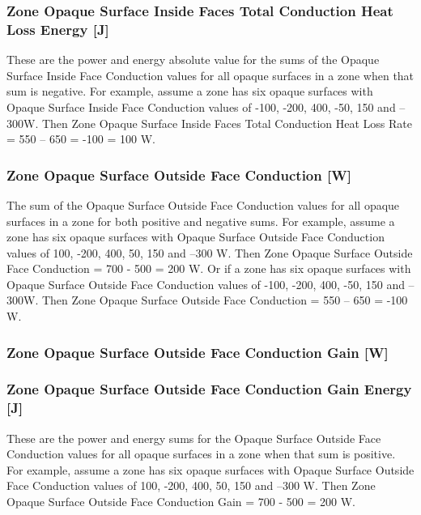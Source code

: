\subsubsection{Zone Opaque Surface Inside Faces Total Conduction Heat Loss Energy {[}J{]}}\label{zone-opaque-surface-inside-faces-total-conduction-heat-loss-energy-j}

These are the power and energy absolute value for the sums of the Opaque Surface Inside Face Conduction values for all opaque surfaces in a zone when that sum is negative. For example, assume a zone has six opaque surfaces with Opaque Surface Inside Face Conduction values of -100, -200, 400, -50, 150 and --300W. Then Zone Opaque Surface Inside Faces Total Conduction Heat Loss Rate = \textbar{}550 -- 650\textbar{} = \textbar{}-100\textbar{} = 100 W.

\subsubsection{Zone Opaque Surface Outside Face Conduction {[}W{]}}\label{zone-opaque-surface-outside-face-conduction-w}

The sum of the Opaque Surface Outside Face Conduction values for all opaque surfaces in a zone for both positive and negative sums. For example, assume a zone has six opaque surfaces with Opaque Surface Outside Face Conduction values of 100, -200, 400, 50, 150 and --300 W. Then Zone Opaque Surface Outside Face Conduction = 700 - 500 = 200 W. Or if a zone has six opaque surfaces with Opaque Surface Outside Face Conduction values of -100, -200, 400, -50, 150 and --300W. Then Zone Opaque Surface Outside Face Conduction = 550 -- 650 = -100 W.

\subsubsection{Zone Opaque Surface Outside Face Conduction Gain {[}W{]}}\label{zone-opaque-surface-outside-face-conduction-gain-w}

\subsubsection{Zone Opaque Surface Outside Face Conduction Gain Energy {[}J{]}}\label{zone-opaque-surface-outside-face-conduction-gain-energy-j}

These are the power and energy sums for the Opaque Surface Outside Face Conduction values for all opaque surfaces in a zone when that sum is positive. For example, assume a zone has six opaque surfaces with Opaque Surface Outside Face Conduction values of 100, -200, 400, 50, 150 and --300 W. Then Zone Opaque Surface Outside Face Conduction Gain = 700 - 500 = 200 W.

